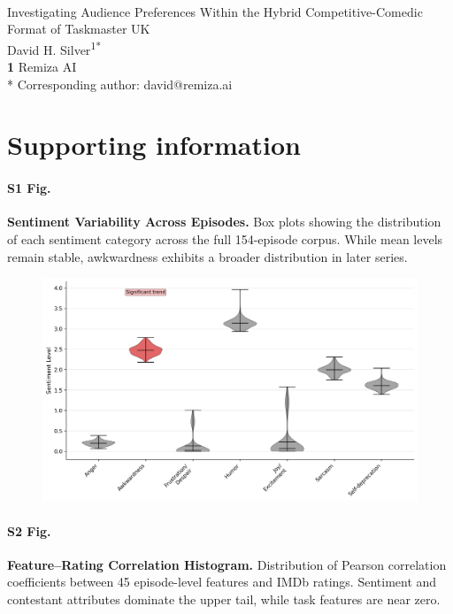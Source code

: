 \documentclass[10pt,letterpaper]{article}
\begin{document}
\vspace*{0.2in}

\begin{flushleft}
{\Large
\textbf{}
}
\newline
\\
Investigating Audience Preferences Within the Hybrid Competitive-Comedic Format of Taskmaster UK
\newline
\\
David H. Silver\textsuperscript{1*}
\\
\bigskip
\textbf{1} Remiza AI\\
\bigskip
* Corresponding author: david@remiza.ai
\end{flushleft}

\section*{Supporting information}

\paragraph*{S1 Fig.}
\label{S1_Fig}
{\bf Sentiment Variability Across Episodes.} 
Box plots showing the distribution of each sentiment category across the full 154-episode corpus. While mean levels remain stable, awkwardness exhibits a broader distribution in later series.

\begin{figure}[!h]
\centering
\includegraphics[width=\linewidth]{figures/supplementary/figure7b.png}
\end{figure}
\FloatBarrier

\paragraph*{S2 Fig.}
\label{S2_Fig}
{\bf Feature–Rating Correlation Histogram.} 
Distribution of Pearson correlation coefficients between 45 episode-level features and IMDb ratings. Sentiment and contestant attributes dominate the upper tail, while task features are near zero.
\end{document}
